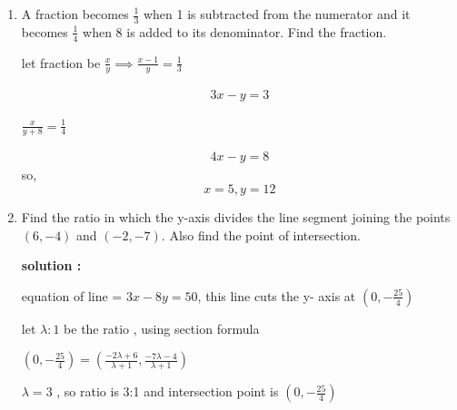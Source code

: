 \begin{enumerate}[label=\thesubsection.\arabic*, ref=\thesubsection.\theenumi]
\begin{center}
	\end{center}
	
	\solution
	
	$AB = CD =12cm $ and $AD = BC = 6\sqrt{2}cm $
	
	area of shaded region = area of parallelogram - area of quarter circle 
	
	$r= 6 cm , \text{area of quarter circle }= \frac{1}{4}\pi r^2 = 9\pi cm^2 $
	
	$\text{area of parallelogram } = b.h ;\text{b= length of base }$
	
	$\text{h= perpendicular length from base to opposite side }$
	
	area of paralellogram = $12*6= 72cm^2$
	
	area of shaded region $=72-9\pi  cm^2= 43.725cm ^2$
	
	\item  A fraction becomes $\frac{1}{3}$ when 1 is subtracted from the numerator and it becomes $\frac{1}{4}$ when 8 is added to its denominator. Find the fraction.  
	
	\solution
	
	let fraction be $\frac{x}{y} \implies \frac{x-1}{y}=\frac{1}{3}$
	
	\begin{align}
		3x-y=3  
	\end{align}
	
	$\frac{x}{y+8}=\frac{1}{4} $
	
	\begin{align}
		4x-y=8 
	\end{align}
	so, $$x=5 , y=12$$
	\item  Find the ratio in which the y-axis divides the line segment joining the points $(6, -4)$ and $(-2, -7)$. Also find the point of intersection. 
	
	\textbf{solution :}
	
	equation of line = $3x-8y=50$, this line cuts the y- axis at $(0,-\frac{25}{4})$
	
	let $\lambda :1 $ be the ratio , using section formula 
	
	$(0,-\frac{25}{4})=\left( \frac{-2\lambda + 6}{\lambda +1} ,\frac{-7\lambda -4}{\lambda +1}\right) $
	
	$\lambda=3 $ , so ratio is 3:1 and intersection point is $(0,-\frac{25}{4})$
	

\end{enumerate}
